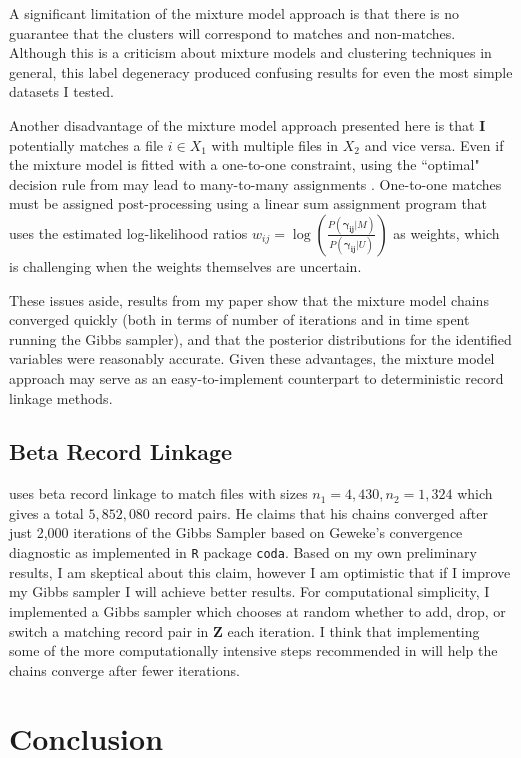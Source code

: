 \documentclass[11pt,reqno]{amsart}
\newcommand\gamij{\mathbf{\gamma_{ij}}}
\begin{document}
A significant limitation of the mixture model approach is that there is no guarantee that the clusters will correspond to matches and non-matches.  Although this is a criticism about mixture models and clustering techniques in general, this label degeneracy produced confusing results for even the most simple datasets I tested.  

Another disadvantage of the mixture model approach presented here is that $\mathbf{I}$ potentially matches a file $i\in X_1$ with multiple files in $X_2$ and vice versa. Even if the mixture model is fitted with a one-to-one constraint, using the ``optimal" decision rule from \cite{fs1969} may lead to many-to-many assignments \citep{sadinle_2017}.  One-to-one matches must be assigned post-processing using a linear sum assignment program that uses the estimated log-likelihood ratios $w_{ij} = \log \left(\frac{P(\gamij | M)}{P(\gamij | U)}\right)$ as weights, which is challenging when the weights themselves are uncertain.   

These issues aside, results from my paper show that the mixture model chains converged quickly (both in terms of number of iterations and in time spent running the Gibbs sampler), and that the posterior distributions for the identified variables were reasonably accurate.  Given these advantages, the mixture model approach may serve as an easy-to-implement counterpart to deterministic record linkage methods.

\subsection{Beta Record Linkage}
 \cite{sadinle_2017} uses beta record linkage to match files with sizes $n_1 = 4,430, n_2 = 1,324$ which gives a total $5,852,080$ record pairs.  He claims that his chains converged after just 2,000 iterations of the Gibbs Sampler based on Geweke's convergence diagnostic as implemented in \texttt{R} package \texttt{coda}.  Based on my own preliminary results, I am skeptical about this claim, however I am optimistic that if I improve my Gibbs sampler I will achieve better results.  For computational simplicity, I implemented a Gibbs sampler which chooses at random whether to add, drop, or switch a matching record pair in $\mathbf{Z}$ each iteration.   I think that implementing some of the more computationally intensive steps recommended in \cite{larsen_2005} will help the chains converge after fewer iterations.
  
\section{Conclusion}
\end{document}
